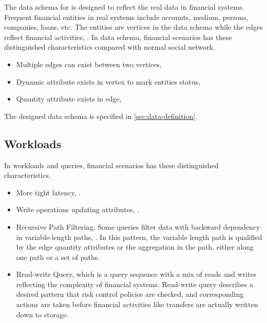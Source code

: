 The data schema for \ldbcfinbench is designed to reflect the real data in financial systems. Frequent
financial entities in real systems include accounts, medium, persons, companies, loans, etc. The
entities are vertices in the data schema while the edges reflect financial activities, . In data schema, financial scenarios has these distinguished characteristics
compared with normal social network.
\begin{itemize}
    \item Multiple edges can exist between two vertices, 
    \item Dynamic attribute exists in vertex to mark entities status, 
    \item Quantity attribute exists in edge, 
\end{itemize}

The designed data schema is specified in \autoref{sec:data-definition}.

\subsection{Workloads}

In workloads and queries, financial scenarios has these distinguished characteristics.
\begin{itemize}
    \item More tight latency, .
    \item Write operations updating attributes, .
    \item Recursive Path Filtering. Some queries filter data with backward dependency
          in variable-length paths, . In this pattern, the variable length path is qualified by
          the edge quantity attributes or the aggregation in the path, either along one path
          or a set of paths.
    \item Read-write Query, which is a query sequence with a mix of reads and writes reflecting the
          complexity of financial systems. Read-write query describes a desired pattern that risk control
          policies are checked, and corresponding actions are taken before financial activities like
          transfers are actually written down to storage.
\end{itemize}

